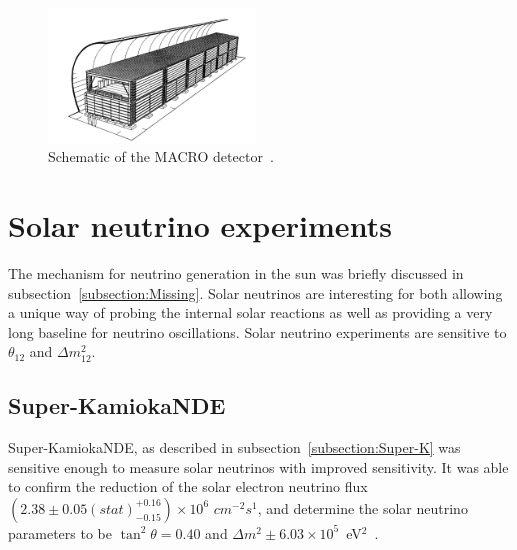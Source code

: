 \begin{figure}[h!]
\centering
  \centering
\includegraphics[width=0.49\textwidth]{figures/MACRO.jpeg}
\vspace{2mm}
\caption{Schematic of the MACRO detector~\cite{61MACRO}.}
\label{fig:macro}
\end{figure}

\pagebreak
\newpage
\section{Solar neutrino experiments}
The mechanism for neutrino generation in the sun was briefly discussed in subsection~\ref{subsection:Missing}.
Solar neutrinos are interesting for both allowing a unique way of probing the internal solar reactions  as well as providing a very long baseline for neutrino oscillations. Solar neutrino experiments are sensitive to $\theta_{12}$ and $\Delta m^2_{12}$.



\subsection{Super-KamiokaNDE}


Super-KamiokaNDE, as described in subsection~\ref{subsection:Super-K} was sensitive enough to measure solar neutrinos with improved sensitivity. It was able to confirm the reduction of the solar electron neutrino flux $(2.38 \pm 0.05(stat) ^{+0.16}_{-0.15}) \times 10^6$ $cm^{-2} s^1$, and determine the solar neutrino parameters to be $\tan^2 \theta = 0.40$ and $\Delta m^2 \pm 6.03\times 10^5$~eV$^2$~\cite{64SuperK}.

